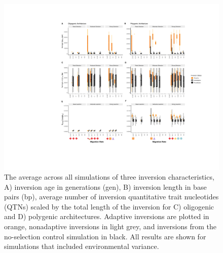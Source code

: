 \documentclass[10pt, scrartlc]{article}
\begin{document}
\clearpage
\newpage

\begin{figure}[h]
	\begin{center}
		\includegraphics[width = 6.5 in]{Fig3_characteristics.pdf}
	\end{center}
	\caption[Inversion Characteristics]{The average across all simulations of three inversion characteristics, A)  inversion age in generations (gen), B)  inversion length in base pairs (bp), average number of inversion quantitative trait nucleotides (QTNs) scaled by the total length of the inversion for C) oligogenic and D) polygenic architectures. Adaptive inversions are plotted in orange, nonadaptive inversions in light grey, and inversions from the no-selection control simulation in black.
 All results are shown for simulations that included environmental variance.}
\end{figure}

\clearpage
\newpage
\end{document}
